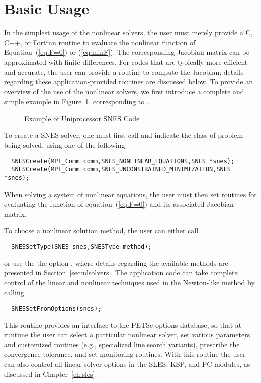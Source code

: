 \section{Basic Usage}
\label{sec:snesusage}

In the simplest usage of the nonlinear solvers, the user must merely 
provide a C, C++, or Fortran routine to evaluate the nonlinear function 
of Equation~(\ref{eq:F=0}) or (\ref{eq:minF}).
The corresponding Jacobian  matrix 
can be approximated with finite differences.
For codes that are typically more efficient and accurate, the
user can provide a routine to compute the Jacobian; details regarding these application-provided 
routines are discussed below.  
To provide an overview of the use of the nonlinear solvers,
we first introduce a complete and simple example in
Figure~\ref{fig:snesexample}, corresponding to 
.  

\begin{figure}[H]
{\small
{}
}
\caption{Example of Uniprocessor SNES Code}
\label{fig:snesexample}
\end{figure}

To create a SNES solver, one must first call  and indicate
the class of problem being solved, using one of the following:
\begin{verbatim}
  SNESCreate(MPI_Comm comm,SNES_NONLINEAR_EQUATIONS,SNES *snes);
  SNESCreate(MPI_Comm comm,SNES_UNCONSTRAINED_MINIMIZATION,SNES *snes);
\end{verbatim}
When solving a system of nonlinear equations, the user must then set
routines for evaluating the function of equation~(\ref{eq:F=0}) and its
associated Jacobian matrix. 

To choose a nonlinear solution method, the user can either
call 
\begin{verbatim}
  SNESSetType(SNES snes,SNESType method);
\end{verbatim}
or use the the option ,  
where details regarding the available methods are presented in
Section~\ref{sec:nlsolvers}.
The application code can take complete control of the linear and
nonlinear techniques used in the Newton-like method by calling
\begin{verbatim}
  SNESSetFromOptions(snes);
\end{verbatim}
This routine provides an interface to the PETSc options database, so
that at runtime the user can select a particular nonlinear solver, set
various parameters and customized routines (e.g., specialized line
search variants), prescribe the convergence tolerance, and set
monitoring routines.  With this routine the user can also control all
linear solver options in the SLES, KSP, and PC modules, as discussed
in Chapter~\ref{ch:sles}.

